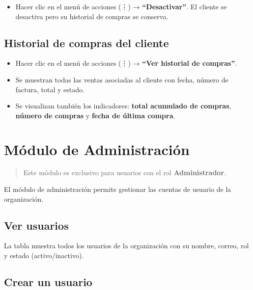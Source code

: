 \begin{itemize}
\tightlist
\item
  Hacer clic en el menú de acciones (⋮) → \textbf{``Desactivar''}. El cliente se desactiva pero su historial de compras se conserva.
\end{itemize}

\subsection{Historial de compras del cliente}\label{historial-de-compras-del-cliente}

\begin{itemize}
\tightlist
\item
  Hacer clic en el menú de acciones (⋮) → \textbf{``Ver historial de compras''}.
\item
  Se muestran todas las ventas asociadas al cliente con fecha, número de factura, total y estado.
\item
  Se visualizan también los indicadores: \textbf{total acumulado de compras}, \textbf{número de compras} y \textbf{fecha de última compra}.
\end{itemize}

\section{Módulo de Administración}\label{muxf3dulo-de-administraciuxf3n}

\begin{quote}
Este módulo es exclusivo para usuarios con el rol \textbf{Administrador}.
\end{quote}

El módulo de administración permite gestionar las cuentas de usuario de la organización.

\subsection{Ver usuarios}\label{ver-usuarios}

La tabla muestra todos los usuarios de la organización con su nombre, correo, rol y estado (activo/inactivo).

\subsection{Crear un usuario}\label{crear-un-usuario}

